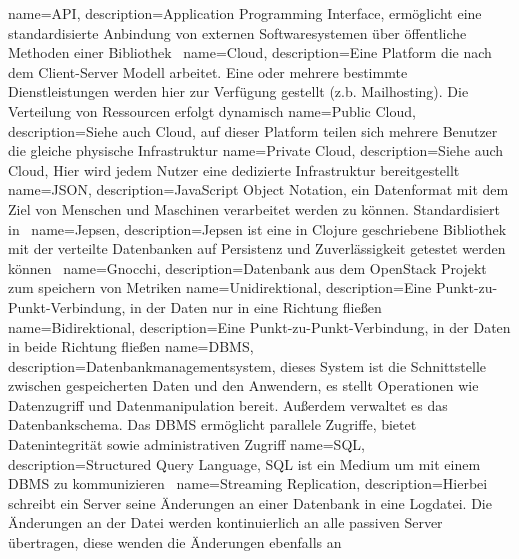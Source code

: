 {
  name=API,
  description={Application Programming Interface, ermöglicht eine
               standardisierte Anbindung von externen Softwaresystemen über
               öffentliche Methoden einer Bibliothek~\cite{HowDoAPIsEvolve}}
}
{
  name=Cloud,
  description={Eine Platform die nach dem Client-Server Modell arbeitet. Eine
               oder mehrere bestimmte Dienstleistungen werden hier zur
               Verfügung gestellt (z.b. Mailhosting). Die Verteilung von
               Ressourcen erfolgt dynamisch}
}
{
  name=Public Cloud,
  description={Siehe auch \gls{Cloud}, auf dieser Platform teilen sich mehrere
               Benutzer die gleiche physische Infrastruktur}
}
{
  name=Private Cloud,
  description={Siehe auch \gls{Cloud}, Hier wird jedem Nutzer eine dedizierte
               Infrastruktur bereitgestellt}
}
{
  name=JSON,
  description={JavaScript Object Notation, ein Datenformat mit dem Ziel von
               Menschen und Maschinen verarbeitet werden zu können.
               Standardisiert in~\cite{RFC7159}}
}
{
  name=Jepsen,
  description={Jepsen ist eine in Clojure geschriebene Bibliothek mit der
               verteilte Datenbanken auf Persistenz und Zuverlässigkeit
               getestet werden können~\cite{Jepsen_Introduction}}
}
{
  name=Gnocchi,
  description={Datenbank aus dem OpenStack Projekt zum speichern von Metriken}
}
{
  name=Unidirektional,
  description={Eine Punkt-zu-Punkt-Verbindung, in der Daten nur in eine Richtung
               fließen}
}
{
  name=Bidirektional,
  description={Eine Punkt-zu-Punkt-Verbindung, in der Daten in beide Richtung
               fließen}
}
{
  name=DBMS,
  description={Datenbankmanagementsystem, dieses System ist die Schnittstelle
               zwischen gespeicherten Daten und den Anwendern, es stellt
               Operationen wie Datenzugriff und Datenmanipulation bereit.
               Außerdem verwaltet es das Datenbankschema. Das DBMS ermöglicht
               parallele Zugriffe, bietet Datenintegrität sowie administrativen
               Zugriff}
}
{
  name=SQL,
  description={Structured Query Language, SQL ist ein Medium um mit einem
               \gls{DBMS} zu kommunizieren~\cite{sumathi2007fundamentals}}
}
{
  name=Streaming Replication,
  description={Hierbei schreibt ein Server seine Änderungen an einer Datenbank
               in eine Logdatei. Die Änderungen an der Datei werden
               kontinuierlich an alle passiven Server übertragen, diese wenden
               die Änderungen ebenfalls an}
}
